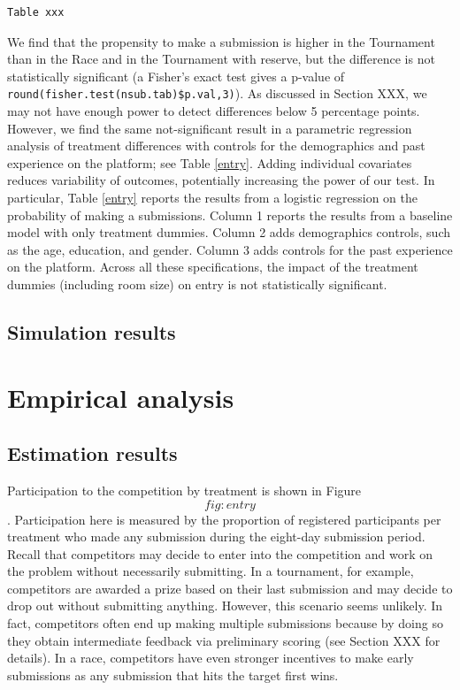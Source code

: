 \documentclass[12pt,]{article}
\begin{document}
\begin{verbatim}
Table xxx
\end{verbatim}

We find that the propensity to make a submission is higher in the
Tournament than in the Race and in the Tournament with reserve, but the
difference is not statistically significant (a Fisher's exact test gives
a p-value of \texttt{round(fisher.test(nsub.tab)\$p.val,3)}). As
discussed in Section XXX, we may not have enough power to detect
differences below 5 percentage points. However, we find the same
not-significant result in a parametric regression analysis of treatment
differences with controls for the demographics and past experience on
the platform; see Table \ref{entry}. Adding individual covariates
reduces variability of outcomes, potentially increasing the power of our
test. In particular, Table \ref{entry} reports the results from a
logistic regression on the probability of making a submissions. Column 1
reports the results from a baseline model with only treatment dummies.
Column 2 adds demographics controls, such as the age, education, and
gender. Column 3 adds controls for the past experience on the platform.
Across all these specifications, the impact of the treatment dummies
(including room size) on entry is not statistically significant.

\subsection{Simulation results}\label{simulation-results}

\section{Empirical analysis}\label{empirical-analysis-1}

\subsection{Estimation results}\label{estimation-results-1}

Participation to the competition by treatment is shown in Figure
\[fig:entry\]. Participation here is measured by the proportion of
registered participants per treatment who made any submission during the
eight-day submission period. Recall that competitors may decide to enter
into the competition and work on the problem without necessarily
submitting. In a tournament, for example, competitors are awarded a
prize based on their last submission and may decide to drop out without
submitting anything. However, this scenario seems unlikely. In fact,
competitors often end up making multiple submissions because by doing so
they obtain intermediate feedback via preliminary scoring (see Section
XXX for details). In a race, competitors have even stronger incentives
to make early submissions as any submission that hits the target first
wins.
\end{document}
